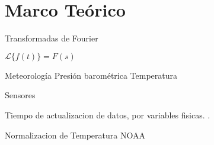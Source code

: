 \section{Marco Teórico}

Transformadas de Fourier

$\mathscr{L}\{f(t)\}=F(s)$

Meteorología
   Presión barométrica
   Temperatura

Sensores

Tiempo de actualizacion de datos, por variables fisicas.
\cite{davis:6152C_6162C_SS}.


Normalizacion de Temperatura
NOAA

